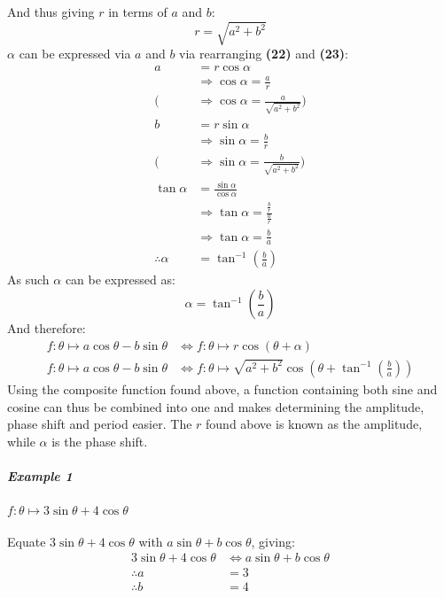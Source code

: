\documentclass{article}
\begin{document}
        And thus giving $r$ in terms of $a$ and $b$:
        \begin{equation}
        r = \sqrt{a^2 + b^2}
        \end{equation}
        $\alpha$ can be expressed via $a$ and $b$ via rearranging \textbf{(22)} and \textbf{(23)}:
        \begin{align*}
        a &= r\cos\alpha \\
        &\Rightarrow \cos\alpha = \frac{a}{r} \\
        (&\Rightarrow \cos\alpha = \frac{a}{\sqrt{a^2 + b^2}}) \\
        b &= r\sin\alpha \\
        &\Rightarrow \sin\alpha = \frac{b}{r} \\
        (&\Rightarrow \sin\alpha = \frac{b}{\sqrt{a^2 + b^2}}) \\
        \tan\alpha &= \frac{\sin\alpha}{\cos\alpha} \\
        &\Rightarrow \tan\alpha = \frac{\frac{b}{r}}{\frac{a}{r}} \\
        &\Rightarrow \tan\alpha = \frac{b}{a} \\
        \therefore \alpha &= \tan^{-1}{\left( \frac{b}{a}\right) }
        \end{align*}
        As such $\alpha$ can be expressed as:
        \begin{equation}
        \alpha = \tan^{-1}{\left( \frac{b}{a}\right) }
        \end{equation}
        And therefore:
        \begin{align*}
        f:\theta \mapsto a\cos\theta - b\sin\theta &\Leftrightarrow f:\theta \mapsto r\cos{(\theta + \alpha)} \\
        f:\theta \mapsto a\cos\theta - b\sin\theta &\Leftrightarrow f:\theta \mapsto \sqrt{a^2 + b^2}\cos{\left( \theta + \tan^{-1}{\left( \frac{b}{a}\right) }\right) }
        \end{align*} \newpage
        Using the composite function found above, a function containing both sine and cosine can thus be combined into one and makes determining the amplitude, phase shift and period easier. The $r$ found above is known as the amplitude, while $\alpha$ is the phase shift.
        \subparagraph{Example 1} $f:\theta \mapsto 3\sin{\theta} + 4\cos{\theta}$ \\\\
        Equate $3\sin{\theta} + 4\cos{\theta}$ with $a\sin{\theta} + b\cos{\theta}$, giving:
        \begin{align*}
        	3\sin{\theta} + 4\cos{\theta} &\Leftrightarrow a\sin{\theta} + b\cos{\theta} \\
        	\therefore a &= 3 \\
        	\therefore b &= 4 \\
        \end{align*}
\end{document}
